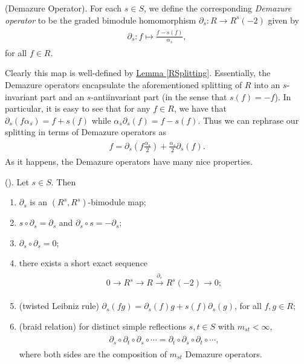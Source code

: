 \noindent\begin{definition}\textup{(Demazure Operator).} For each $s \in S$, we define the corresponding {\em Demazure operator} to be the graded bimodule homomorphism $\partial_s : R \to R^s(-2)$ given by
\begin{align*}
\begin{split}
\partial_s : f \mapsto \frac{f - s(f)}{\alpha_s},
\end{split}
\end{align*}
for all $f \in R$.\\
\end{definition}

\noindent Clearly this map is well-defined by \hyperref[RSplitting]{Lemma \ref*{RSplitting}}. Essentially, the Demazure operators encapsulate the aforementioned splitting of $R$ into an $s$-invariant part and an $s$-antiinvariant part (in the sense that $s(f) = -f$). In particular, it is easy to see that for any $f \in R$, we have that $\partial_s(f\alpha_s) = f + s(f)$ while $\alpha_s\partial_s(f) = f - s(f)$. Thus we can rephrase our splitting in terms of Demazure operators as
\begin{align*}
\begin{split}
f = \partial_s\left(f\frac{\alpha_s}{2}\right) + \frac{\alpha_s}{2}\partial_s(f).
\end{split}
\end{align*}
\noindent As it happens, the Demazure operators have many nice properties.\\

\noindent\begin{lemma}\textup{(\cite[Lemma 4.15]{EMTW20}).} Let $s \in S$. Then
\begin{enumerate}[label=\textup{(\roman*).}, leftmargin=4\parindent]
\item $\partial_s$ is an $(R^s, R^s)$-bimodule map;
\item $s \circ \partial_s = \partial_s$ and $\partial_s \circ s = -\partial_s$;
\item $\partial_s \circ \partial_s = 0$;
\item there exists a short exact sequence
\begin{align*}
\begin{split}
0 \to R^s \to R \overset{\partial_s}{\to} R^s(-2) \to 0;
\end{split}
\end{align*}
\item (twisted Leibniz rule) $\partial_s(fg) = \partial_s(f)g + s(f)\partial_s(g)$, for all $f, g \in R$;
\item\label{DemazureBraid} (braid relation) for distinct simple reflections $s, t \in S$ with $m_{st} < \infty$,
\begin{align*}
\begin{split}
\partial_s \circ \partial_t \circ \partial_s \circ \cdots = \partial_t \circ \partial_s \circ \partial_t \circ \cdots,
\end{split}
\end{align*}
where both sides are the composition of $m_{st}$ Demazure operators.\\
\end{enumerate}
\end{lemma}

